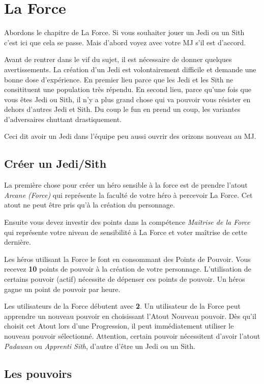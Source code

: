 \section{La Force}
\label{sec:force}

Abordons le chapitre de La Force. Si vous souhaiter jouer un Jedi ou un Sith c’est ici que cela se passe. Mais d’abord voyez avec votre MJ s’il est d’accord.

Avant de rentrer dans le vif du sujet, il est nécessaire de donner quelques avertissements. La création d’un Jedi est volontairement difficile et demande une bonne dose d’expérience. En premier lieu parce que les Jedi et les Sith ne consitituent une population très répendu. En second lieu, parce qu’une fois que vous êtes Jedi ou Sith, il n’y a plus grand chose qui va pouvoir vous résister en dehors d’autres Jedi et Sith. Du coup le fun en prend un coup, les variantes d’adversaires chuttant drastiquement.

Ceci dit avoir un Jedi dans l’équipe peu aussi ouvrir des orizons nouveau au MJ.

\subsection{Créer un Jedi/Sith}
La première chose pour créer un héro sensible à la force est de prendre l’atout \emph{Arcane (Force)} qui représente la faculté de votre héro à percevoir La Force. Cet atout ne peut être pris qu'à la création du personnage.

Ensuite vous devez investir des points dans la compétence \emph{Maîtrise de la Force} qui représente votre niveau de sensibilité à La Force et voter maîtrise de cette dernière.

Les héros utilisant la Force le font en consommant des Points de Pouvoir. Vous recevez \textbf{10} points de pouvoir à la création de votre personnage. L’utilisation de certains pouvoir (actif) nécessite de dépenser ces points de pouvoir. Un héros gagne un point de pouvoir par heure.

Les utilisateurs de la Force débutent avec \textbf{2}. Un utilisateur de la Force peut apprendre un nouveau pouvoir en choisissant l’Atout Nouveau pouvoir. Dès qu’il choisit cet Atout lors d’une Progression, il peut immédiatement utiliser le nouveau pouvoir sélectionné. Attention, certain pouvoir nécessitent d'avoir l'atout \emph{Padawan} ou \emph{Apprenti Sith}, d'autre d'être un Jedi ou un Sith.

\subsection{Les pouvoirs}

